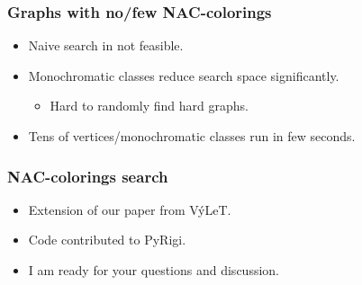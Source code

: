 \documentclass[aspectratio=\myaspectratio]{beamer}
\begin{document}
\begin{frame}
	\frametitle{Graphs with no/few NAC-colorings}
	\begin{itemize}
		\item
		      Naive search in not feasible.
		\item
		      Monochromatic classes reduce search space significantly.
		      \begin{itemize}
			      \item Hard to randomly find hard graphs.
		      \end{itemize}
		\item
		      Tens of vertices/monochromatic classes run in few seconds.
	\end{itemize}
\end{frame}

\begin{frame}
	\frametitle{NAC-colorings search}
	\begin{itemize}
		\item
		      Extension of our paper from VýLeT.
		\item
		      Code contributed to PyRigi.
		\item
		      I am ready for your questions and discussion.
	\end{itemize}
\end{frame}
\end{document}
